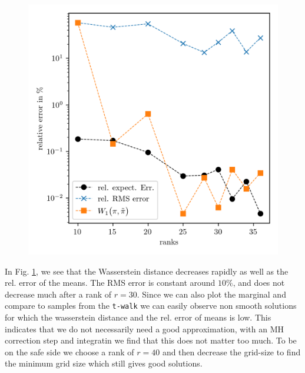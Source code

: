 \begin{figure}[ht!]%
	\includegraphics[]{findRank.png}
	\caption[Find Ranks]{}
	\label{fig:FindRanks}
\end{figure}
In Fig. \ref{fig:FindRanks}, we see that the Wasserstein distance decreases rapidly as well as the rel. error of the means.
The RMS error is constant around $10\%$, and does not decrease much after a rank of $r = 30$.
Since we can also plot the marginal and compare to samples from the \texttt{t-walk} we can easily observe non smooth solutions for which the wasserstein distance and the rel. error of means is low.
This indicates that we do not necessarily need a good approximation, with an MH correction step and integratin we find that this does not matter too much.
To be on the safe side we choose a rank of $r = 40$ and then decrease the grid-size to find the minimum grid size which still gives good solutions.


